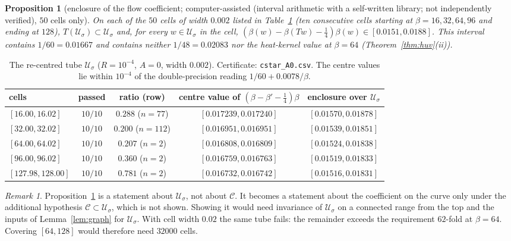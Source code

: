 \documentclass[11pt,a4paper]{article}
\newtheorem{proposition}[theorem]{Proposition}
\theoremstyle{definition}
\theoremstyle{remark}
\newtheorem{remark}[theorem]{Remark}
\newcommand{\code}[1]{\texttt{#1}}
\newcommand{\cU}{\mathcal{U}}
\newcommand{\cC}{\mathcal{C}}
\newcommand{\IA}{computer-assisted (interval arithmetic with a self-written library; not independently verified)}
\begin{document}
\begin{proposition}[enclosure of the flow coefficient; \IA, $50$ cells only]\label{prop:window}
On each of the $50$ cells of width $0.002$ listed in Table~\ref{tab:cstar} (ten consecutive cells starting at $\beta=16,32,64,96$ and ending at $128$), $T(\cU_\sigma)\subset\cU_\sigma$ and, for every $w\in\cU_\sigma$ in the cell, $(\beta(w)-\beta(Tw)-\tfrac14)\beta(w)\in[0.0151,0.0188]$.
This interval contains $1/60=0.01667$ and contains neither $1/48=0.02083$ nor the heat-kernel value at $\beta=64$ (Theorem~\ref{thm:huv}(ii)).
\end{proposition}

\begin{table}[ht]\centering\small
\begin{tabular}{lcccc}
\toprule
cells & passed & ratio (row) & centre value of $(\beta-\beta'-\tfrac14)\beta$ & enclosure over $\cU_\sigma$ \\
\midrule
$[16.00,16.02]$ & $10/10$ & $0.288$ ($n=77$) & $[0.017239,0.017240]$ & $[0.01570,0.01878]$ \\
$[32.00,32.02]$ & $10/10$ & $0.200$ ($n=112$) & $[0.016951,0.016951]$ & $[0.01539,0.01851]$ \\
$[64.00,64.02]$ & $10/10$ & $0.207$ ($n=2$) & $[0.016808,0.016809]$ & $[0.01524,0.01838]$ \\
$[96.00,96.02]$ & $10/10$ & $0.360$ ($n=2$) & $[0.016759,0.016763]$ & $[0.01519,0.01833]$ \\
$[127.98,128.00]$ & $10/10$ & $0.781$ ($n=2$) & $[0.016732,0.016742]$ & $[0.01516,0.01831]$ \\
\bottomrule
\end{tabular}
\caption{The re-centred tube $\cU_\sigma$ ($R=10^{-4}$, $A=0$, width $0.002$). Certificate: \code{cstar\_A0.csv}. The centre values lie within $10^{-4}$ of the double-precision reading $1/60+0.0078/\beta$.}\label{tab:cstar}
\end{table}

\begin{remark}
Proposition~\ref{prop:window} is a statement about $\cU_\sigma$, not about $\cC$.
It becomes a statement about the coefficient on the curve only under the additional hypothesis $\cC\subset\cU_\sigma$, which is not shown.
Showing it would need invariance of $\cU_\sigma$ on a connected range from the top and the inputs of Lemma~\ref{lem:graph} for $\cU_\sigma$.
With cell width $0.02$ the same tube fails: the remainder exceeds the requirement $62$-fold at $\beta=64$.
Covering $[64,128]$ would therefore need $32000$ cells.
\end{remark}
\end{document}
